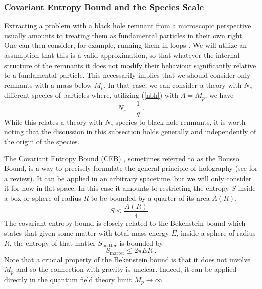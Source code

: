 \documentclass[11pt,a4paper]{article}
\numberwithin{equation}{section}
\numberwithin{table}{section}\setlength{\multlinegap}{25pt}
\newcommand{\be}{\begin{equation}}
\newcommand{\ee}{\end{equation}}
\begin{document}
\subsubsection{Covariant Entropy Bound and the Species Scale}
\label{sec:cebss}

Extracting a problem with a black hole remnant from a microscopic perspective usually amounts to treating them as fundamental particles in their own right. One can then consider, for example, running them in loops \cite{Susskind:1995da}. We will utilize an assumption that this is a valid approximation, so that whatever the internal structure of the remnants it does not modify their behaviour significantly relative to a fundamental particle. This necessarily implies that we should consider only remnants with a mass below $M_p$. In that case, we can consider a theory with $N_s$ different species of particles where, utilizing (\ref{nbh}) with $\Lambda =M_p$, we have
\be
N_s=\frac{1}{g}\;.
\ee 
While this relates a theory with $N_s$ species to black hole remnants, it is worth noting that the discussion in this subsection holds generally and independently of the origin of the species. 

The Covariant Entropy Bound (CEB) \cite{Fischler:1998st,Bousso:1999xy}, sometimes referred to as the Bousso Bound, is a way to precisely formulate the general principle of holography \cite{tHooft:1993dmi} (see \cite{Bousso:2002ju} for a review). It can be applied in an arbitrary spacetime, but we will only consider it for now in flat space. In this case it amounts to restricting the entropy $S$ inside a box or sphere of radius $R$ to be bounded by a quarter of its area $A\left(R\right)$,
\be
\label{fsceb}
S \leq \frac{A\left(R\right)}{4} \;.
\ee
The covariant entropy bound is closely related to the Bekenstein bound \cite{Bekenstein:1972tm,Bekenstein:1973ur,Bekenstein:1974ax} which states that given some matter with total mass-energy $E$, inside a sphere of radius $R$, the entropy of that matter $S_{\mathrm{matter}}$ is bounded by
\be
\label{bekb}
S_{\mathrm{matter}} \leq 2 \pi E R \;.
\ee
Note that a crucial property of the Bekenstein bound is that it does not involve $M_p$ and so the connection with gravity is unclear. Indeed, it can be applied directly in the quantum field theory limit $M_p \rightarrow \infty$. 
\end{document}
